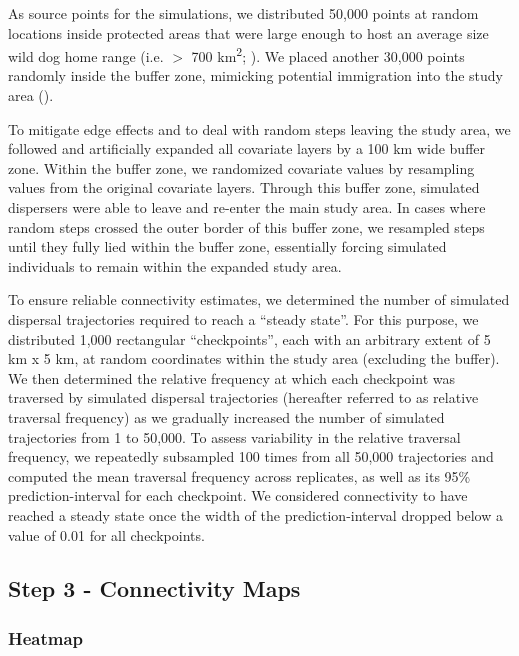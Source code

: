 \documentclass[../FinalThesis.tex]{subfiles}
\begin{document}
As source points for the simulations, we distributed 50,000 points at random
locations inside protected areas that were large enough to host an average size
wild dog home range (i.e. \(>\) 700 km\textsuperscript{2};
\citealp{Pomilia.2015}). We placed another 30,000 points randomly inside the
buffer zone, mimicking potential immigration into the study area
().

To mitigate edge effects and to deal with random steps leaving the study area,
we followed \citet{Koen.2010} and artificially expanded all covariate layers by a
100 km wide buffer zone. Within the buffer zone, we randomized covariate values
by resampling values from the original covariate layers. Through this buffer
zone, simulated dispersers were able to leave and re-enter the main study area.
In cases where random steps crossed the outer border of this buffer zone, we
resampled steps until they fully lied within the buffer zone, essentially
forcing simulated individuals to remain within the expanded study area.

To ensure reliable connectivity estimates, we determined the number of simulated
dispersal trajectories required to reach a ``steady state''. For this purpose,
we distributed 1,000 rectangular ``checkpoints'', each with an arbitrary extent
of 5 km x 5 km, at random coordinates within the study area (excluding the
buffer). We then determined the relative frequency at which each checkpoint was
traversed by simulated dispersal trajectories (hereafter referred to as relative
traversal frequency) as we gradually increased the number of simulated
trajectories from 1 to 50,000. To assess variability in the relative traversal
frequency, we repeatedly subsampled 100 times from all 50,000 trajectories and
computed the mean traversal frequency across replicates, as well as its 95\%
prediction-interval for each checkpoint. We considered connectivity to have
reached a steady state once the width of the prediction-interval dropped below a
value of 0.01 for all checkpoints.

\subsection{Step 3 - Connectivity Maps}
\subsubsection{Heatmap}
\end{document}
